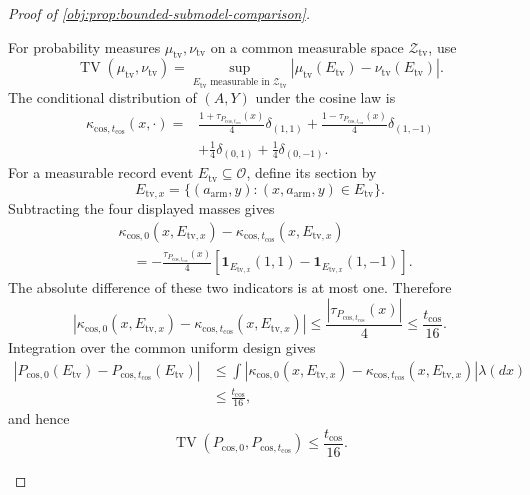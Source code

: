 \documentclass[11pt]{article}
\begin{document}
\begin{proof}[Proof of \cref{obj:prop:bounded-submodel-comparison}]
\begin{enumerate}
For probability measures \(\mu_{\mathrm{tv}},\nu_{\mathrm{tv}}\) on a common measurable space \(\mathcal Z_{\mathrm{tv}}\), use
\[
\operatorname{TV}(\mu_{\mathrm{tv}},\nu_{\mathrm{tv}})
=
\sup_{E_{\mathrm{tv}}\text{ measurable in }\mathcal Z_{\mathrm{tv}}}
|\mu_{\mathrm{tv}}(E_{\mathrm{tv}})
 -\nu_{\mathrm{tv}}(E_{\mathrm{tv}})|.
\]
The conditional distribution of \((A,Y)\) under the cosine law is
\[
\begin{split}
\kappa_{\mathrm{cos},t_{\mathrm{cos}}}(x,\cdot)
={}&\frac{1+\tau_{P_{\mathrm{cos},t_{\mathrm{cos}}}}(x)}4
       \delta_{(1,1)}
+\frac{1-\tau_{P_{\mathrm{cos},t_{\mathrm{cos}}}}(x)}4
       \delta_{(1,-1)}\\
&+\frac14\delta_{(0,1)}+\frac14\delta_{(0,-1)}.
\end{split}
\]
For a measurable record event \(E_{\mathrm{tv}}\subseteq\mathcal O\), define its section by
\[
E_{\mathrm{tv},x}
=\{(a_{\mathrm{arm}},y):
  (x,a_{\mathrm{arm}},y)\in E_{\mathrm{tv}}\}.
\]
Subtracting the four displayed masses gives
\[
\begin{split}
&\kappa_{\mathrm{cos},0}(x,E_{\mathrm{tv},x})
-\kappa_{\mathrm{cos},t_{\mathrm{cos}}}(x,E_{\mathrm{tv},x})\\
&\quad=
-\frac{\tau_{P_{\mathrm{cos},t_{\mathrm{cos}}}}(x)}4
\left[
\mathbf1_{E_{\mathrm{tv},x}}(1,1)
-\mathbf1_{E_{\mathrm{tv},x}}(1,-1)
\right].
\end{split}
\]
The absolute difference of these two indicators is at most one. Therefore
\[
\left|
\kappa_{\mathrm{cos},0}(x,E_{\mathrm{tv},x})
-\kappa_{\mathrm{cos},t_{\mathrm{cos}}}(x,E_{\mathrm{tv},x})
\right|
\le
\frac{|\tau_{P_{\mathrm{cos},t_{\mathrm{cos}}}}(x)|}{4}
\le\frac{t_{\mathrm{cos}}}{16}.
\]
Integration over the common uniform design gives
\[
\begin{split}
|P_{\mathrm{cos},0}(E_{\mathrm{tv}})
-P_{\mathrm{cos},t_{\mathrm{cos}}}(E_{\mathrm{tv}})|
&\le
\int
\left|
\kappa_{\mathrm{cos},0}(x,E_{\mathrm{tv},x})
-\kappa_{\mathrm{cos},t_{\mathrm{cos}}}(x,E_{\mathrm{tv},x})
\right|\lambda(dx)\\
&\le\frac{t_{\mathrm{cos}}}{16},
\end{split}
\]
and hence
\[
\operatorname{TV}
(P_{\mathrm{cos},0},P_{\mathrm{cos},t_{\mathrm{cos}}})
\le\frac{t_{\mathrm{cos}}}{16}.
\]


\end{enumerate}
\end{proof}
\end{document}
